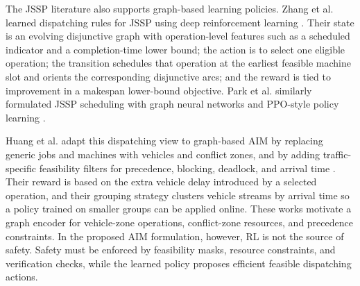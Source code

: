 The JSSP literature also supports graph-based learning policies. Zhang et al. learned dispatching rules for JSSP using deep reinforcement learning \cite{zhang2020learning}. Their state is an evolving disjunctive graph with operation-level features such as a scheduled indicator and a completion-time lower bound; the action is to select one eligible operation; the transition schedules that operation at the earliest feasible machine slot and orients the corresponding disjunctive arcs; and the reward is tied to improvement in a makespan lower-bound objective. Park et al. similarly formulated JSSP scheduling with graph neural networks and PPO-style policy learning \cite{park2021learning}.

Huang et al. adapt this dispatching view to graph-based AIM by replacing generic jobs and machines with vehicles and conflict zones, and by adding traffic-specific feasibility filters for precedence, blocking, deadlock, and arrival time \cite{huang2023reinforcement}. Their reward is based on the extra vehicle delay introduced by a selected operation, and their grouping strategy clusters vehicle streams by arrival time so a policy trained on smaller groups can be applied online. These works motivate a graph encoder for vehicle-zone operations, conflict-zone resources, and precedence constraints. In the proposed AIM formulation, however, RL is not the source of safety. Safety must be enforced by feasibility masks, resource constraints, and verification checks, while the learned policy proposes efficient feasible dispatching actions.

